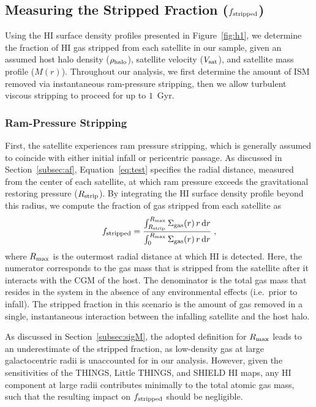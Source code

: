 \documentclass[usenatbib]{mn2e}
\begin{document}

\subsection{Measuring the Stripped Fraction (\boldmath$f_{\rm stripped}$)}
\label{subsec:frac} 
Using the H{\scriptsize I} surface density profiles presented in
Figure~\ref{fig:h1}, we determine the fraction of H{\scriptsize I} gas
stripped from each satellite in our sample, given an assumed host halo
density ($\rho_{\rm halo}$), satellite velocity ($V_{\rm sat}$), and
satellite mass profile ($M(r)$).
%
Throughout our analysis, we first determine the amount of ISM removed
via instantaneous ram-pressure stripping, then we allow turbulent
viscous stripping to proceed for up to $1$~Gyr.

\subsubsection{Ram-Pressure Stripping}
First, the satellite experiences ram pressure stripping, which is
generally assumed to coincide with either initial infall or pericentric
passage. As discussed in Section~\ref{subsec:af},
Equation~\ref{eq:test} specifies the radial distance, measured from
the center of each satellite, at which ram pressure exceeds the
gravitational restoring pressure ($R_{\rm strip}$).
%
By integrating the H{\scriptsize I} surface density profile beyond
this radius, we compute the fraction of gas stripped from each
satellite as
%
\begin{equation}
f_{\rm stripped} = \frac{\int_{R_{\rm strip}}^{R_{\rm max}} \Sigma_{\rm gas}(r)\,
  r\, {\rm d}r}{\int_{0}^{R_{\rm max}} \Sigma_{\rm gas}(r)\, r\, {\rm d}r}  \; ,
\label{eq:frac}
\end{equation}
%
where $R_{\rm max}$ is the outermost radial distance at which
H{\scriptsize I} is detected.
%
Here, the numerator corresponds to the gas mass that is stripped from
the satellite after it interacts with the CGM of the host. The
denominator is the total gas mass that resides in the system in the
absence of any environmental effects (i.e.~prior to infall).
%
The stripped fraction in this scenario is the amount of gas removed in
a single, instantaneous interaction between the infalling satellite
and the host halo.



As discussed in Section~\ref{subsec:sigM}, the adopted definition for
$R_{\rm max}$ leads to an underestimate of the stripped fraction, as
low-density gas at large galactocentric radii is unaccounted for in
our analysis. However, given the sensitivities of the THINGS, Little
THINGS, and SHIELD H{\scriptsize I} maps, any H{\scriptsize I}
component at large radii contributes minimally to the total atomic gas
mass, such that the resulting impact on $f_{\rm stripped}$ should be
negligible.
\end{document}
